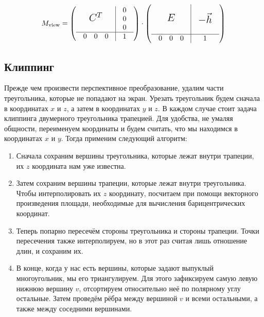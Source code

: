 \documentclass{article}
\begin{document}
\begin{equation*}
	M_{\text{view}} =
		\left(
			\begin{array}{c|c}
				\mbox{\Large $C^{T}$} &
				\begin{array}{c}
					0 \\ 0 \\ 0
				\end{array} \\ \hline
				\begin{array}{ccc}
					0 & 0 & 0
				\end{array} & 1
			\end{array}
		\right)
		\cdot
		\left(
			\begin{array}{c|c}
				\mbox{\Large $E$} &
				\begin{array}{c}
					\\ \mbox{\Large $-\vec{h}$} \\ \\
				\end{array} \\
				\hline
				\begin{array}{ccc}
					0 & 0 & 0
				\end{array} & 1
			\end{array}
		\right)
\end{equation*}

\subsection{Клиппинг}

Прежде чем произвести перспективное преобразование, удалим части треугольника, которые не попадают на экран.
Урезать треугольник будем сначала в координатах $x$ и $z$, а затем в координатах $y$ и $z$.
В каждом случае стоит задача клиппинга двумерного треугольника трапецией.
Для удобства, не умаляя общности, переименуем координаты и будем считать, что мы находимся в координатах $x$ и $y$.
Тогда применим следующий алгоритм:

\begin{enumerate}
	\item Сначала сохраним вершины треугольника, которые лежат внутри трапеции, их $z$ координата нам уже известна.
	\item Затем сохраним вершины трапеции, которые лежат внутри треугольника.
	Чтобы интерполировать их $z$ координату, посчитаем при помощи векторного произведения площади, необходимые для вычисления барицентрических координат.
	\item Теперь попарно пересечём стороны треугольника и стороны трапеции.
	Точки пересечения также интерполируем, но в этот раз считая лишь отношение длин, и сохраним их.
	\item В конце, когда у нас есть вершины, которые задают выпуклый многоугольник, мы его триангулируем.
	Для этого зафиксируем самую левую нижнюю вершину $v$, отсортируем относительно неё по полярному углу остальные.
	Затем проведём рёбра между вершиной $v$ и всеми остальными, а также между соседними вершинами.
\end{enumerate}
\end{document}

